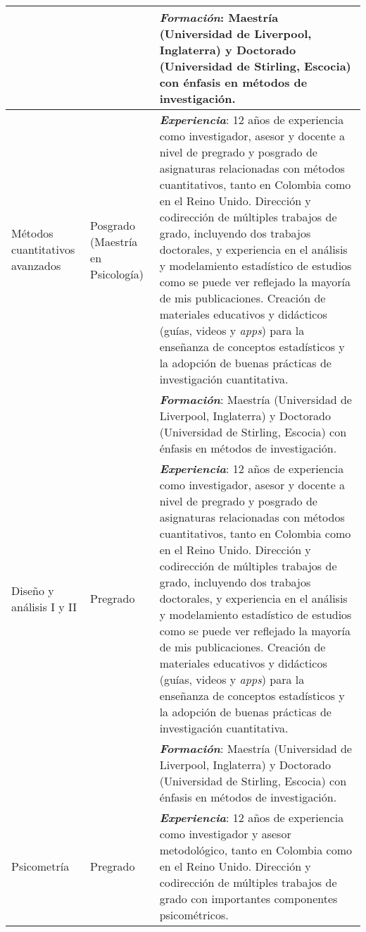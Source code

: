 \documentclass[11pt,a4paper,]{awesome-cv}
\begin{document}
\begin{table}[!h]
\begin{tabular}{|>{\centering\arraybackslash}p{7em}|>{\centering\arraybackslash}p{6em}|>{\raggedright\arraybackslash}p{40em}|}
\hspace{1em} &  & \textit{\textbf{Formación}}: Maestría (Universidad de Liverpool, Inglaterra) y Doctorado (Universidad de Stirling, Escocia) con énfasis en métodos de \vphantom{3} investigación.\\
\hline
\hspace{1em}\vfill \vfill Métodos cuantitativos avanzados & \vfill \vfill Posgrado (Maestría en Psicología) & \textit{\textbf{Experiencia}}: 12 años de experiencia como investigador, asesor y docente a nivel de pregrado y posgrado de asignaturas relacionadas con métodos cuantitativos, tanto en Colombia como en el Reino Unido. Dirección y codirección de múltiples trabajos de grado, incluyendo dos trabajos doctorales, y experiencia en el análisis y modelamiento estadístico de estudios como se puede ver reflejado la mayoría de mis publicaciones. Creación de materiales educativos y didácticos (guías, videos y \textit{apps}) para la enseñanza de conceptos estadísticos y la adopción de buenas prácticas de investigación cuantitativa.\\
\hspace{1em} &  & \textit{\textbf{Formación}}: Maestría (Universidad de Liverpool, Inglaterra) y Doctorado (Universidad de Stirling, Escocia) con énfasis en métodos de \vphantom{2} investigación.\\
\hline
\vfill \vfill Diseño y análisis
\hspace{1em}I y II & \vfill \vfill Pregrado & \textit{\textbf{Experiencia}}: 12 años de experiencia como investigador, asesor y docente a nivel de pregrado y posgrado de asignaturas relacionadas con métodos cuantitativos, tanto en Colombia como en el Reino Unido. Dirección y codirección de múltiples trabajos de grado, incluyendo dos trabajos doctorales, y experiencia en el análisis y modelamiento estadístico de estudios como se puede ver reflejado la mayoría de mis publicaciones. Creación de materiales educativos y didácticos (guías, videos y \textit{apps}) para la enseñanza de conceptos estadísticos y la adopción de buenas prácticas de investigación cuantitativa.\\
\hspace{1em} &  & \textit{\textbf{Formación}}: Maestría (Universidad de Liverpool, Inglaterra) y Doctorado (Universidad de Stirling, Escocia) con énfasis en métodos de \vphantom{1} investigación.\\
\hline
\hspace{1em}\vfill \vfill Psicometría & \vfill \vfill Pregrado & \textit{\textbf{Experiencia}}: 12 años de experiencia como investigador y asesor metodológico, tanto en Colombia como en el Reino Unido. Dirección y codirección de múltiples trabajos de grado con importantes componentes psicométricos.\\

\end{tabular}
\end{table}
\end{document}

